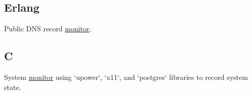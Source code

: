 \documentclass[11pt]{article}
\newcommand{\git}[2]{\href {https://github.com/azimut/#2} {#1}}
\newcommand{\project}{\item}
\begin{document}
\subsection{Erlang}
\begin{projects}
\project Public DNS record {\git{monitor}{snitch}}.
\end{projects}

\subsection{C}
\begin{projects}
\project System {\git{monitor}{sleeper}} using `upower`, `x11`, and `postgres` libraries to record system state.
\end{projects}
\end{document}
